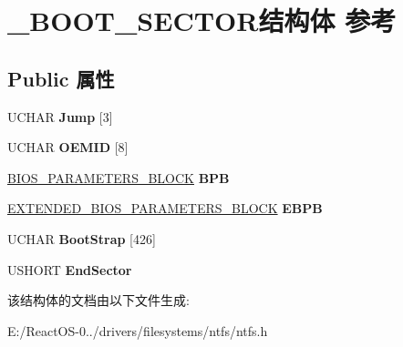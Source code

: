 \hypertarget{struct___b_o_o_t___s_e_c_t_o_r}{}\section{\+\_\+\+B\+O\+O\+T\+\_\+\+S\+E\+C\+T\+O\+R结构体 参考}
\label{struct___b_o_o_t___s_e_c_t_o_r}
\subsection*{Public 属性}
\begin{DoxyCompactItemize}
\item 
\mbox{\label{struct___b_o_o_t___s_e_c_t_o_r_aa9e2a59def361a0598910c608270df27}} 
U\+C\+H\+AR {\bfseries Jump} \mbox{[}3\mbox{]}
\item 
\mbox{\label{struct___b_o_o_t___s_e_c_t_o_r_aea056a0a448916d84be8521082e82089}} 
U\+C\+H\+AR {\bfseries O\+E\+M\+ID} \mbox{[}8\mbox{]}
\item 
\mbox{\label{struct___b_o_o_t___s_e_c_t_o_r_a74c9b9c960a453728949e17574758205}} 
\hyperlink{struct___b_i_o_s___p_a_r_a_m_e_t_e_r_s___b_l_o_c_k}{B\+I\+O\+S\+\_\+\+P\+A\+R\+A\+M\+E\+T\+E\+R\+S\+\_\+\+B\+L\+O\+CK} {\bfseries B\+PB}
\item 
\mbox{\label{struct___b_o_o_t___s_e_c_t_o_r_ad0a482f5a781b456ee9834dc8389dbcb}} 
\hyperlink{struct___e_x_t_e_n_d_e_d___b_i_o_s___p_a_r_a_m_e_t_e_r_s___b_l_o_c_k}{E\+X\+T\+E\+N\+D\+E\+D\+\_\+\+B\+I\+O\+S\+\_\+\+P\+A\+R\+A\+M\+E\+T\+E\+R\+S\+\_\+\+B\+L\+O\+CK} {\bfseries E\+B\+PB}
\item 
\mbox{\label{struct___b_o_o_t___s_e_c_t_o_r_ab13584cf474bceefea4d036063d277e3}} 
U\+C\+H\+AR {\bfseries Boot\+Strap} \mbox{[}426\mbox{]}
\item 
\mbox{\label{struct___b_o_o_t___s_e_c_t_o_r_a26c1faa38f3ecf197e9ce23e2364ec2f}} 
U\+S\+H\+O\+RT {\bfseries End\+Sector}
\end{DoxyCompactItemize}


该结构体的文档由以下文件生成\+:\begin{DoxyCompactItemize}
\item 
E\+:/\+React\+O\+S-\/0../drivers/filesystems/ntfs/ntfs.\+h\end{DoxyCompactItemize}
